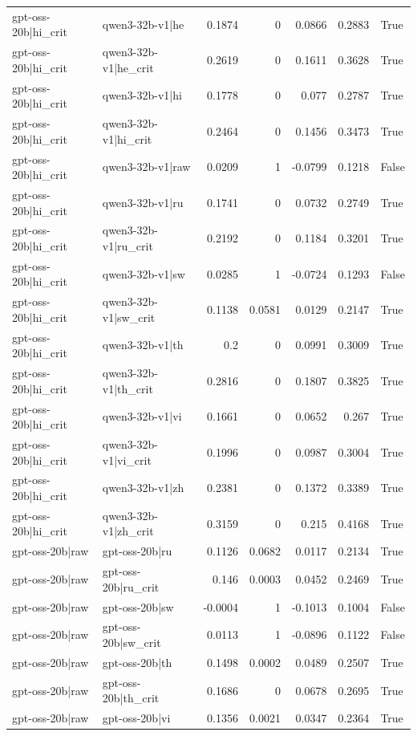 \begin{table}
\begin{tabular}{l l r r r r l}
gpt-oss-20b|hi_crit & qwen3-32b-v1|he & 0.1874 & 0 & 0.0866 & 0.2883 & True \\
gpt-oss-20b|hi_crit & qwen3-32b-v1|he_crit & 0.2619 & 0 & 0.1611 & 0.3628 & True \\
gpt-oss-20b|hi_crit & qwen3-32b-v1|hi & 0.1778 & 0 & 0.077 & 0.2787 & True \\
gpt-oss-20b|hi_crit & qwen3-32b-v1|hi_crit & 0.2464 & 0 & 0.1456 & 0.3473 & True \\
gpt-oss-20b|hi_crit & qwen3-32b-v1|raw & 0.0209 & 1 & -0.0799 & 0.1218 & False \\
gpt-oss-20b|hi_crit & qwen3-32b-v1|ru & 0.1741 & 0 & 0.0732 & 0.2749 & True \\
gpt-oss-20b|hi_crit & qwen3-32b-v1|ru_crit & 0.2192 & 0 & 0.1184 & 0.3201 & True \\
gpt-oss-20b|hi_crit & qwen3-32b-v1|sw & 0.0285 & 1 & -0.0724 & 0.1293 & False \\
gpt-oss-20b|hi_crit & qwen3-32b-v1|sw_crit & 0.1138 & 0.0581 & 0.0129 & 0.2147 & True \\
gpt-oss-20b|hi_crit & qwen3-32b-v1|th & 0.2 & 0 & 0.0991 & 0.3009 & True \\
gpt-oss-20b|hi_crit & qwen3-32b-v1|th_crit & 0.2816 & 0 & 0.1807 & 0.3825 & True \\
gpt-oss-20b|hi_crit & qwen3-32b-v1|vi & 0.1661 & 0 & 0.0652 & 0.267 & True \\
gpt-oss-20b|hi_crit & qwen3-32b-v1|vi_crit & 0.1996 & 0 & 0.0987 & 0.3004 & True \\
gpt-oss-20b|hi_crit & qwen3-32b-v1|zh & 0.2381 & 0 & 0.1372 & 0.3389 & True \\
gpt-oss-20b|hi_crit & qwen3-32b-v1|zh_crit & 0.3159 & 0 & 0.215 & 0.4168 & True \\
gpt-oss-20b|raw & gpt-oss-20b|ru & 0.1126 & 0.0682 & 0.0117 & 0.2134 & True \\
gpt-oss-20b|raw & gpt-oss-20b|ru_crit & 0.146 & 0.0003 & 0.0452 & 0.2469 & True \\
gpt-oss-20b|raw & gpt-oss-20b|sw & -0.0004 & 1 & -0.1013 & 0.1004 & False \\
gpt-oss-20b|raw & gpt-oss-20b|sw_crit & 0.0113 & 1 & -0.0896 & 0.1122 & False \\
gpt-oss-20b|raw & gpt-oss-20b|th & 0.1498 & 0.0002 & 0.0489 & 0.2507 & True \\
gpt-oss-20b|raw & gpt-oss-20b|th_crit & 0.1686 & 0 & 0.0678 & 0.2695 & True \\
gpt-oss-20b|raw & gpt-oss-20b|vi & 0.1356 & 0.0021 & 0.0347 & 0.2364 & True \\

\end{tabular}
\end{table}
